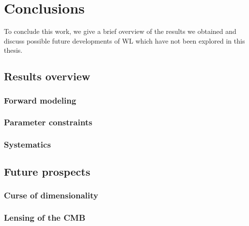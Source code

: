
\chapter{Conclusions}
\lhead[\fancyplain{}{\thepage}]{\fancyplain{}{\rightmark}}
 \thispagestyle{plain}
\setlength{\parindent}{10mm}
\label{chp:8}

To conclude this work, we give a brief overview of the results we obtained and discuss possible future developments of WL which have not been explored in this thesis. 

\section{Results overview}

\subsection{Forward modeling}
\subsection{Parameter constraints}
\subsection{Systematics}

\section{Future prospects}

\subsection{Curse of dimensionality}
\subsection{Lensing of the CMB}

